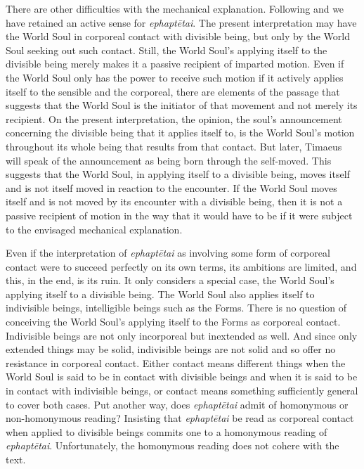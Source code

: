 There are other difficulties with the mechanical explanation. Following \citet{Corcilius:2018bd} and \citet{Betegh:2019fq} we have retained an active sense for \emph{ephaptētai}. The present interpretation may have the World Soul in corporeal contact with divisible being, but only by the World Soul seeking out such contact. Still, the World Soul's applying itself to the divisible being merely makes it a passive recipient of imparted motion. Even if the World Soul only has the power to receive such motion if it actively applies itself to the sensible and the corporeal, there are elements of the passage that suggests that the World Soul is the initiator of that movement and not merely its recipient. On the present interpretation, the opinion, the soul's announcement concerning the divisible being that it applies itself to, is the World Soul's motion throughout its whole being that results from that contact. But later, Timaeus will speak of the announcement as being born through the self-moved. This suggests that the World Soul, in applying itself to a divisible being, moves itself and is not itself moved in reaction to the encounter. If the World Soul moves itself and is not moved by its encounter with a divisible being, then it is not a passive recipient of motion in the way that it would have to be if it were subject to the envisaged mechanical explanation. 

Even if the interpretation of \emph{ephaptētai} as involving some form of corporeal contact were to succeed perfectly on its own terms, its ambitions are limited, and this, in the end, is its ruin. It only considers a special case, the World Soul's applying itself to a divisible being. The World Soul also applies itself to indivisible beings, intelligible beings such as the Forms. There is no question of conceiving the World Soul's applying itself to the Forms as corporeal contact. Indivisible beings are not only incorporeal but inextended as well. And since only extended things may be solid, indivisible beings are not solid and so offer no resistance in corporeal contact. Either contact means different things when the World Soul is said to be in contact with divisible beings and when it is said to be in contact with indivisible beings, or contact means something sufficiently general to cover both cases. Put another way, does \emph{ephaptētai} admit of homonymous or non-homonymous reading? Insisting that \emph{ephaptētai} be read as corporeal contact when applied to divisible beings commits one to a homonymous reading of \emph{ephaptētai}. Unfortunately, the homonymous reading does not cohere with the text.

